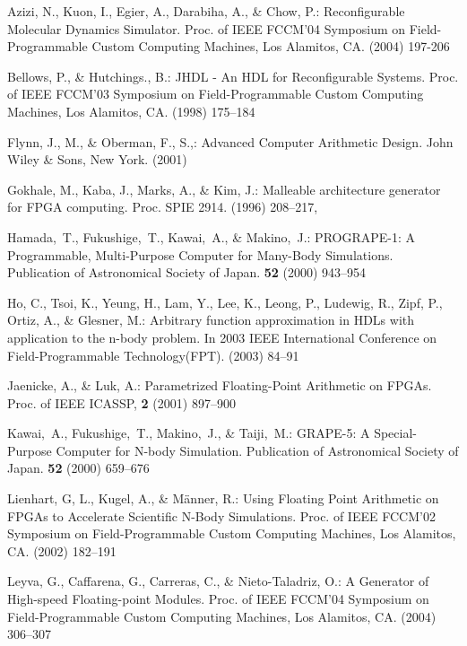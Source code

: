 \documentclass{llncs}
\begin{document}

\begin{thebibliography}{}

Azizi, N., Kuon, I., Egier, A., Darabiha, A., \& Chow, P.:
Reconfigurable Molecular Dynamics Simulator.
Proc. of IEEE FCCM'04 Symposium on Field-Programmable Custom Computing Machines, Los Alamitos, CA.
(2004) 197-206

Bellows, P., \& Hutchings., B.:
JHDL - An HDL for Reconfigurable Systems.
Proc. of IEEE FCCM'03 Symposium on Field-Programmable Custom Computing Machines, Los Alamitos, CA.
(1998) 175--184

Flynn, J., M., \& Oberman, F., S.,:
Advanced Computer Arithmetic Design.
John Wiley \& Sons, New York.
(2001)

Gokhale, M., Kaba, J., Marks, A., \& Kim, J.:
Malleable architecture generator for FPGA computing.
Proc. SPIE 2914.
(1996) 208--217,

Hamada,~T., Fukushige,~T., Kawai,~A., \& Makino,~J.:
PROGRAPE-1: A Programmable, Multi-Purpose Computer for Many-Body Simulations.
Publication of Astronomical Society of Japan.
{\bfseries 52} (2000) 943--954

Ho, C., Tsoi, K., Yeung, H., Lam, Y., Lee, K., Leong, P., Ludewig, R., Zipf, P., Ortiz, A., \& Glesner, M.:
Arbitrary function approximation in HDLs with application to the n-body problem.
In 2003 IEEE International Conference on Field-Programmable Technology(FPT).
(2003) 84--91

Jaenicke, A., \& Luk, A.:
Parametrized Floating-Point Arithmetic on FPGAs.
Proc. of IEEE ICASSP, 
{\bfseries 2} (2001) 897--900

Kawai,~A., Fukushige,~T., Makino,~J., \& Taiji,~M.:
GRAPE-5: A Special-Purpose Computer for N-body Simulation.
Publication of Astronomical Society of Japan.
{\bfseries 52} (2000) 659--676

Lienhart, G, L., Kugel, A., \& M{\"a}nner, R.:
Using Floating Point Arithmetic on FPGAs to Accelerate Scientific N-Body Simulations.
Proc. of IEEE FCCM'02 Symposium on Field-Programmable Custom Computing Machines, Los Alamitos, CA.
(2002) 182--191

Leyva, G., Caffarena, G., Carreras, C., \& Nieto-Taladriz, O.:
A Generator of High-speed Floating-point Modules.
Proc. of IEEE FCCM'04 Symposium on Field-Programmable Custom Computing Machines, Los Alamitos, CA.
(2004) 306--307 


\end{thebibliography}
\end{document}
